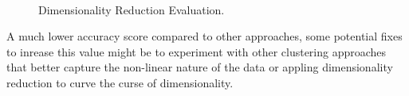 \documentclass[11pt]{article}
\begin{document}
\begin{singlespace}
\begin{figure}[h]
     \\
    \caption{Dimensionality Reduction Evaluation.}
\end{figure} 

A much lower accuracy score compared to other approaches, some potential fixes to inrease this value might be to experiment with other clustering approaches that better capture the non-linear nature of the data or appling dimensionality reduction to curve the curse of dimensionality. \\



\end{singlespace}
\end{document}
